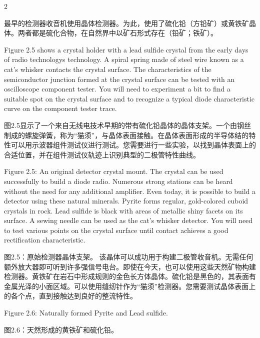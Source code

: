\documentclass{ctexbook}
\begin{document}
\begin{paracol}{2}
\switchcolumn

最早的检测器收音机使用晶体检测器。为此，使用了硫化铅（方铅矿）或黄铁矿晶体。两者都是硫化合物，在自然界中以矿石形式存在（铅矿；铁矿）。

\switchcolumn*

Figure 2.5 shows a crystal holder with a lead sulfide crystal from the early days of radio 
technologys technology. A spiral spring made of steel wire known as a cat's whisker contacts the crystal 
surface. The characteristics of the semiconductor junction formed at the crystal surface can 
be tested with an oscilloscope component tester. You will need to experiment a bit to find 
a suitable spot on the crystal surface and to recognize a typical diode characteristic curve 
on the component tester trace. 

\switchcolumn

图2.5显示了一个来自无线电技术早期的带有硫化铅晶体的晶体支架。一个由钢丝制成的螺旋弹簧，称为“猫须”，与晶体表面接触。在晶体表面形成的半导体结的特性可以用示波器组件测试仪进行测试。您需要进行一些实验，以找到晶体表面上的合适位置，并在组件测试仪轨迹上识别典型的二极管特性曲线。

\switchcolumn*

Figure 2.5: An original detector crystal mount. 
The crystal can be used successfully to build a diode radio. Numerous strong stations can 
be heard without the need for any additional amplifier. Even today, it is possible to build a 
detector using these natural minerals. Pyrite forms regular, gold-colored cuboid crystals in 
rock. Lead sulfide is black with areas of metallic shiny facets on its surface. A sewing needle 
can be used as the cat's whisker detector. You will need to test various points on the crystal 
surface until contact achieves a good rectification characteristic. 

\switchcolumn

图2.5：原始检测器晶体支架。
该晶体可以成功用于构建二极管收音机。无需任何额外放大器即可听到许多强信号电台。即使在今天，也可以使用这些天然矿物构建检测器。黄铁矿在岩石中形成规则的金色长方体晶体。硫化铅是黑色的，其表面有金属光泽的小面区域。可以使用缝纫针作为“猫须”检测器。您需要测试晶体表面上的各个点，直到接触达到良好的整流特性。

\switchcolumn*

Figure 2.6: Naturally formed Pyrite and Lead sulfide. 

\switchcolumn

图2.6：天然形成的黄铁矿和硫化铅。

\switchcolumn*


\end{paracol}
\end{document}
